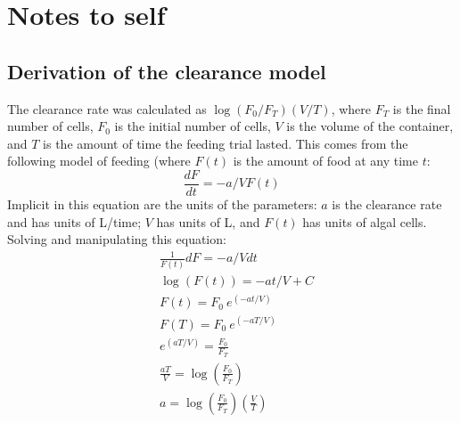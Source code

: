 \documentclass[11pt,reqno,final,pdftex]{amsart}\usepackage[]{graphicx}\usepackage[]{color}
\theoremstyle{plain}
\numberwithin{equation}{part}
\begin{document}
\section*{Notes to self}
\subsection*{Derivation of the clearance model}
The clearance rate was calculated as $\log(F_0/F_T) (V/T)$, where $F_T$ is the final number of cells, $F_0$ is the initial number of cells, $V$ is the volume of the container, and $T$ is the amount of time the feeding trial lasted.
This comes from the following model of feeding (where $F(t)$ is the amount of food at any time $t$:
\begin{equation}
\frac{dF}{dt} = -a/V F(t)
\end{equation}
Implicit in this equation are the units of the parameters: $a$ is the clearance rate and has units of L/time; $V$ has units of L, and $F(t)$ has units of algal cells.
Solving and manipulating this equation:
\begin{align}
&\frac{1}{F(t)} dF = -a/V dt \\
&\log(F(t)) = -at/V + C \\
&F(t) = F_0~e^(-at/V) \\
&F(T) = F_0~e^(-aT/V) \\
&e^(aT/V) = \frac{F_0}{F_T} \\
&\frac{aT}{V} = \log\left(\frac{F_0}{F_T}\right) \\
& a = \log\left(\frac{F_0}{F_T}\right) \left(\frac{V}{T}\right)
\end{align}
\end{document}
